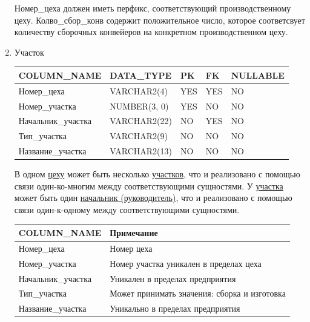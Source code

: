 \begin{enumerate}
\begin{tabular}{|p{7cm}|p{3cm}|p{1cm}|p{1cm}|p{3cm}|}
    \end{tabular}

    Номер\_цеха должен иметь перфикс, соответствующий производственному цеху.
    Колво\_сбор\_конв содержит положительное число, которое соответсвует количеству сборочных конвейеров на конкретном производственном цеху.

    \item{Участок}

    \begin{tabular}{|p{7cm}|p{3cm}|p{1cm}|p{1cm}|p{3cm}|} \hline

        {\bf COLUMN\_NAME} & {\bf DATA\_TYPE} & {\bf PK} & {\bf FK} & {\bf NULLABLE} \\ \hline
        Номер\_цеха & VARCHAR2(4) & YES & YES & NO \\ \hline
        Номер\_участка & NUMBER(3, 0) & YES & NO & NO \\ \hline
        Начальник\_участка & VARCHAR2(22) & NO & YES & NO \\ \hline
        Тип\_участка & VARCHAR2(9) & NO & NO & NO \\ \hline
        Название\_участка & VARCHAR2(13) & NO & NO & NO \\ \hline

    \end{tabular}

    В одном \underline{цеху} может быть несколько \underline{участков}, что и реализовано с помощью связи один-ко-многим между соответствующими сущностями.
    У \underline{участка} может быть один \underline{начальник (руководитель)}, что и реализовано с помощью связи один-к-одному между соответствующими сущностями.

    \begin{tabular}{|p{7cm}|p{9.3cm}|} \hline

        {\bf COLUMN\_NAME} & {\bf Примечание} \\ \hline
        Номер\_цеха & Номер цеха \\ \hline
        Номер\_участка & Номер участка уникален в пределах цеха \\ \hline
        Начальник\_участка & Уникален в пределах предприятия \\ \hline
        Тип\_участка & Может принимать значения: сборка и изготовка \\ \hline
        Название\_участка & Уникально в пределах предприятия \\ \hline

    \end{tabular}


\end{enumerate}
